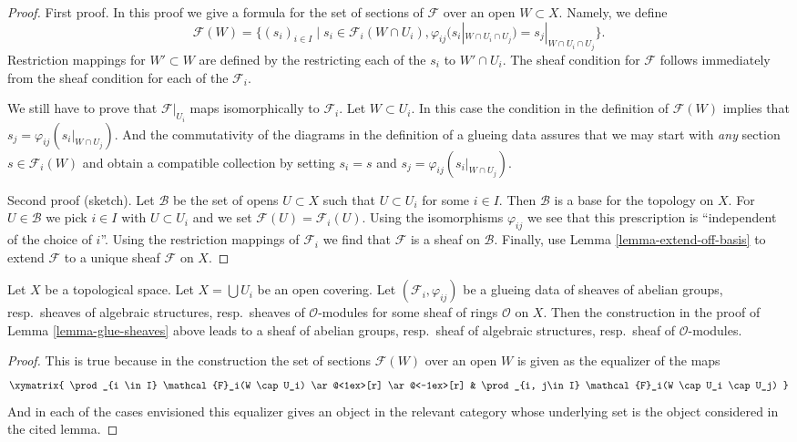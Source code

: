 \begin{proof}
First proof. In this proof we give a formula for the set of sections
of $\mathcal{F}$ over an open $W \subset X$. Namely, we define
$$
\mathcal{F}(W) =
\{
(s_i)_{i \in I} \mid
s_i \in \mathcal{F}_i(W \cap U_i),
\varphi_{ij}(s_i|_{W \cap U_i \cap U_j}) = s_j|_{W \cap U_i \cap U_j}
\}.
$$
Restriction mappings for $W' \subset W$ are defined by the restricting
each of the $s_i$ to $W' \cap U_i$. The sheaf condition for $\mathcal{F}$
follows immediately from the sheaf condition for each of the
$\mathcal{F}_i$.

\medskip\noindent
We still have to prove that $\mathcal{F}|_{U_i}$ maps
isomorphically to $\mathcal{F}_i$. Let $W \subset U_i$.
In this case the condition in the definition of
$\mathcal{F}(W)$ implies that $s_j = \varphi_{ij}(s_i|_{W \cap U_j})$.
And the commutativity of the diagrams in the definition
of a glueing data assures that we may start with {\it any}
section $s \in \mathcal{F}_i(W)$ and obtain a compatible
collection by setting $s_i = s$ and $s_j = \varphi_{ij}(s_i|_{W \cap U_j})$.

\medskip\noindent
Second proof (sketch). Let $\mathcal{B}$ be the set of opens $U \subset X$
such that $U \subset U_i$ for some $i \in I$. Then $\mathcal{B}$
is a base for the topology on $X$. For $U \in \mathcal{B}$ we pick
$i \in I$ with $U \subset U_i$ and we set $\mathcal{F}(U) = \mathcal{F}_i(U)$.
Using the isomorphisms $\varphi_{ij}$ we see that this prescription
is ``independent of the choice of $i$''. Using the restriction mappings
of $\mathcal{F}_i$ we find that $\mathcal{F}$ is a sheaf on $\mathcal{B}$.
Finally, use Lemma \ref{lemma-extend-off-basis} to extend $\mathcal{F}$
to a unique sheaf $\mathcal{F}$ on $X$.
\end{proof}

\begin{lemma}
\label{lemma-glue-sheaves-structures}
Let $X$ be a topological space.
Let $X = \bigcup U_i$ be an open covering.
Let $(\mathcal{F}_i, \varphi_{ij})$ be a glueing data
of sheaves of abelian groups, resp.\ sheaves of algebraic structures,
resp.\ sheaves of $\mathcal{O}$-modules for some sheaf of rings
$\mathcal{O}$ on $X$. Then the construction in the proof of
Lemma \ref{lemma-glue-sheaves} above leads to a sheaf
of abelian groups, resp.\ sheaf of algebraic structures,
resp.\ sheaf of $\mathcal{O}$-modules.
\end{lemma}

\begin{proof}
This is true because in the construction the set of sections
$\mathcal{F}(W)$ over an open $W$ is given as the
equalizer of the maps
$$
\xymatrix{
\prod_{i \in I} \mathcal{F}_i(W \cap U_i)
\ar@<1ex>[r]
\ar@<-1ex>[r]
&
\prod_{i, j\in I} \mathcal{F}_i(W \cap U_i \cap U_j)
}
$$
And in each of the cases envisioned this equalizer gives
an object in the relevant category whose underlying set is
the object considered in the cited lemma.
\end{proof}

